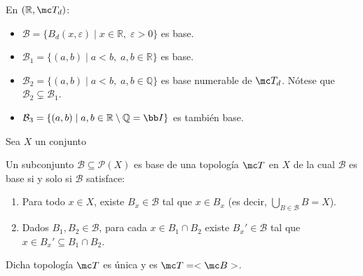 \begin{ejem}
En \((\mathbb{R}, \mc T_d)\):
\begin{itemize}
    \item \(\mathcal{B} = \{B_d(x, \varepsilon) \mid x \in \mathbb{R}, \; \varepsilon > 0\}\) es base.
    \item \(\mathcal{B}_1 = \{(a, b) \mid a < b, \; a, b \in \mathbb{R}\}\) es base.
    \item \(\mathcal{B}_2 = \{(a, b) \mid a < b, \; a, b \in \mathbb{Q}\}\) es base numerable de \(\mc T_d\). Nótese que \(\mathcal{B}_2 \subsetneq \mathcal{B}_1\).
    \item \(\mathcal{B}_3 = \{(a, b) \mid a, b \in \mathbb{R} \setminus \mathbb{Q} = \bb I \}\) es también base.
\end{itemize}
\end{ejem}
Sea $X$ un conjunto
\begin{teo}
Un subconjunto \(\mathcal{B} \subseteq \mathcal{P}(X)\) es base de una topología \(\mc T\) en \(X\) de la cual \(\mathcal{B}\) es base si y solo si \(\mathcal{B}\) satisface:
\begin{enumerate}
    \item[\textbf{1)}] Para todo \(x \in X\), existe \(B_x \in \mathcal{B}\) tal que \(x \in B_x\) (es decir, \(\bigcup_{B \in \mathcal{B}} B = X\)).
    \item[\textbf{2)}] Dados \(B_1, B_2 \in \mathcal{B}\), para cada \(x \in B_1 \cap B_2\) existe \(B_x' \in \mathcal{B}\) tal que \(x \in B_x' \subseteq B_1 \cap B_2\).
\end{enumerate}
Dicha topología \(\mc T\) es única y es $\mc T = <\mc B>$.
\end{teo}

